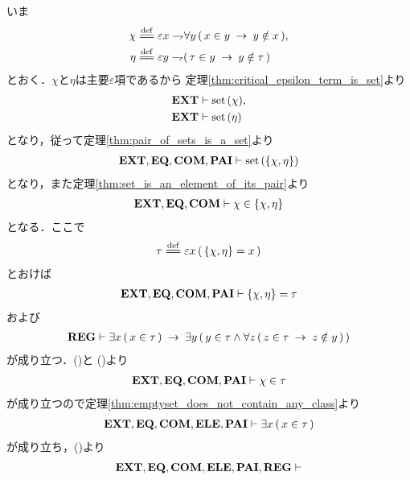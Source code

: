 	\begin{sketch}
		いま
		\begin{align}
			\chi &\defeq \varepsilon x \negation \forall y\, (\, x \in y \rarrow y \notin x\, ), \\
			\eta &\defeq \varepsilon y \negation (\, \tau \in y \rarrow y \notin \tau\, )
		\end{align}
		とおく．$\chi$と$\eta$は主要$\varepsilon$項であるから
		定理\ref{thm:critical_epsilon_term_is_set}より
		\begin{align}
			\mbox{{\bf EXT}} &\vdash \operatorname*{set}\hspace{0.15em}(\chi), \\
			\mbox{{\bf EXT}} &\vdash \operatorname*{set}\hspace{0.15em}(\eta)
		\end{align}
		となり，従って定理\ref{thm:pair_of_sets_is_a_set}より
		\begin{align}
			\mbox{{\bf EXT}},\mbox{{\bf EQ}},\mbox{\bf COM},\mbox{{\bf PAI}} \vdash \operatorname*{set}\hspace{0.15em}(\{\chi,\eta\})
		\end{align}
		となり，また定理\ref{thm:set_is_an_element_of_its_pair}より
		\begin{align}
			\mbox{{\bf EXT}},\mbox{{\bf EQ}},\mbox{\bf COM} \vdash \chi \in \{\chi,\eta\}
			\label{fom:no_pair_of_sets_go_round_1}
		\end{align}
		となる．ここで
		\begin{align}
			\tau \defeq \varepsilon x\, (\, \{\chi,\eta\} = x\, )
		\end{align}
		とおけば
		\begin{align}
			\mbox{{\bf EXT}},\mbox{{\bf EQ}},\mbox{\bf COM},\mbox{{\bf PAI}} \vdash \{\chi,\eta\} = \tau
			\label{fom:no_pair_of_sets_go_round_2}
		\end{align}
		および
		\begin{align}
			\mbox{{\bf REG}} \vdash \exists x\, (\, x \in \tau\, ) 
			\hspace{0.25em}\rightarrow\hspace{0.25em} \exists y\, (\, y \in \tau \wedge \forall z\, (\, z \in \tau 
			\hspace{0.25em}\rightarrow\hspace{0.25em} z \notin y\, )\, )
			\label{fom:no_pair_of_sets_go_round_3}
		\end{align}
		が成り立つ．()と
		()より
		\begin{align}
			\mbox{{\bf EXT}},\mbox{{\bf EQ}},\mbox{\bf COM},\mbox{{\bf PAI}} \vdash \chi \in \tau
			\label{fom:no_pair_of_sets_go_round_6}
		\end{align}
		が成り立つので定理\ref{thm:emptyset_does_not_contain_any_class}より
		\begin{align}
			\mbox{{\bf EXT}},\mbox{{\bf EQ}},\mbox{\bf COM},\mbox{{\bf ELE}},\mbox{{\bf PAI}} \vdash \exists x\, (\, x \in \tau\, )
		\end{align}
		が成り立ち，()より
		\begin{align}
			\EXTAX,\EQAX,\COMAX,\ELEAX,\PAIAX,\REGAX \vdash

\end{align}
\end{sketch}
